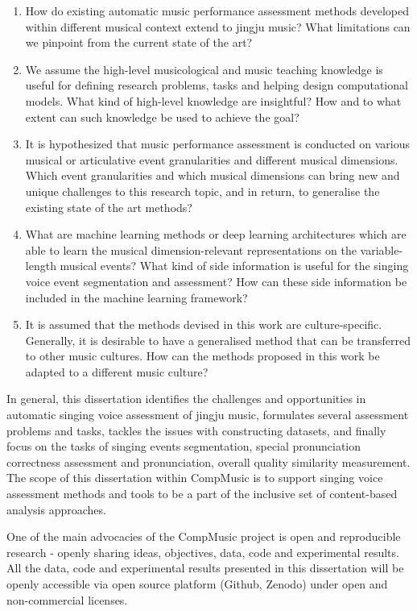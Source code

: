 \begin{enumerate}[leftmargin=*]
\item How do existing automatic music performance assessment methods developed within different musical context extend to jingju music? What limitations can we pinpoint from the current state of the art?
\item We assume the high-level musicological and music teaching knowledge is useful for defining research problems, tasks and helping design computational models. What kind of high-level knowledge are insightful? How and to what extent can such knowledge be used to achieve the goal?
\item It is hypothesized that music performance assessment is conducted on various musical or articulative event granularities and different musical dimensions. Which event granularities and which musical dimensions can bring new and unique challenges to this research topic, and in return, to generalise the existing state of the art methods?
\item What are machine learning methods or deep learning architectures which are able to learn the musical dimension-relevant representations on the variable-length musical events? What kind of side information is useful for the singing voice event segmentation and assessment? How can these side information be included in the machine learning framework?
\item It is assumed that the methods devised in this work are culture-specific. Generally, it is desirable to have a generalised method that can be transferred to other music cultures. How can the methods proposed in this work be adapted to a different music culture? 
\end{enumerate}

In general, this dissertation identifies the challenges and opportunities in automatic singing voice assessment of jingju music, formulates several assessment problems and tasks, tackles the issues with constructing datasets, and finally focus on the tasks of singing events segmentation, special pronunciation correctness assessment and pronunciation, overall quality similarity measurement. The scope of this dissertation within CompMusic is to support singing voice assessment methods and tools to be a part of the inclusive set of content-based analysis approaches.

One of the main advocacies of the CompMusic project is open and reproducible research - openly sharing ideas, objectives, data, code and experimental results. All the data, code and experimental results presented in this dissertation will be openly accessible via open source platform (Github, Zenodo) under open and non-commercial licenses.


